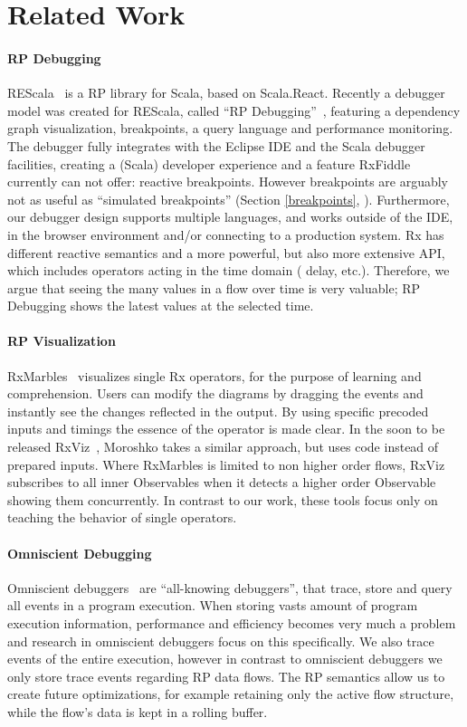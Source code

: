 \section{Related Work}

\paragraph{RP Debugging} REScala~\cite{salvaneschi2014rescala} is a RP
library for Scala, based on Scala.React.  Recently a debugger model was
created for REScala, called ``RP Debugging''~\cite{salvaneschi2016debugging},
featuring a dependency graph visualization, breakpoints, a query
language and performance monitoring.  The debugger fully integrates with
the Eclipse IDE and the Scala debugger facilities, creating a (Scala)
developer experience and a feature RxFiddle currently can not offer:
reactive breakpoints.  However breakpoints are arguably not as useful as
``simulated breakpoints'' (Section%
\ref{breakpoints}, ).  Furthermore, our debugger
design supports multiple languages, and works outside of the IDE, in the
browser environment and/or connecting to a production system.  Rx has
different reactive semantics and a more powerful, but also more
extensive API, which includes operators acting in the time domain (\code
{delay}, etc.).  Therefore, we argue that seeing the many values in a
flow over time is very valuable; RP Debugging shows the latest values at
the selected time.

\paragraph{RP Visualization} RxMarbles~\cite{rxmarbles} visualizes
single Rx operators, for the purpose of learning and comprehension.
Users can modify the diagrams by dragging the events and instantly see
the changes reflected in the output.  By using specific precoded inputs
and timings the essence of the operator is made clear.  In the soon to
be released RxViz~\cite{rxviz}, Moroshko takes a similar approach, but
uses code instead of prepared inputs.  Where RxMarbles is limited to non
higher order flows, RxViz subscribes to all inner Observables when it
detects a higher order Observable showing them concurrently.  In
contrast to our work, these tools focus only on teaching the behavior of
single operators.

\paragraph{Omniscient Debugging} Omniscient debuggers~\cite{pothier2009back}
are ``all-knowing debuggers'', that trace, store and query all events in
a program execution.  When storing vasts amount of program execution
information, performance and efficiency becomes very much a problem and
research in omniscient debuggers focus on this specifically.  We also
trace events of the entire execution, however in contrast to omniscient
debuggers we only store trace events regarding RP data flows.  The RP
semantics allow us to create future optimizations, for example retaining
only the active flow structure, while the flow's data is kept in a
rolling buffer.

